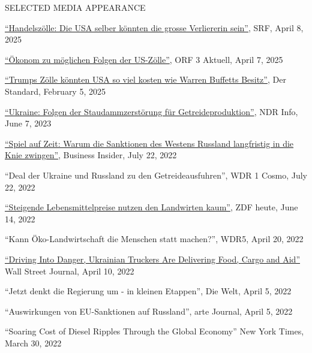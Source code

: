 \documentclass{article}
\begin{document}
\begin{minipage}[t]{0.12\textwidth}
    {\selectfont SELECTED MEDIA \mbox APPEARANCE} \\
\end{minipage}
\hspace{5mm}
\begin{minipage}[t]{0.8\textwidth}
  \href{https://www.srf.ch/audio/echo-der-zeit/handelszoelle-die-usa-selber-koennten-die-grosse-verliererin-sein?partId=77nj5adJX0fKQd92D0cUOK53Vmw}{``Handelszölle: Die USA selber könnten die grosse Verliererin sein''}, SRF, April 8, 2025 \par
  \href{https://on.orf.at/video/14270682/15857146/oekonom-zu-moeglichen-folgen-der-us-zoelle}{``Ökonom zu möglichen Folgen der US-Zölle''}, ORF 3 Aktuell, April 7, 2025 \par
    \href{https://www.derstandard.de/story/3000000256055/trumps-zoelle-koennten-usa-so-viel-kosten-wie-warren-buffett-besitzt}{``Trumps Zölle könnten USA so viel kosten wie Warren Buffetts Besitz''}, Der Standard, February 5, 2025 \par
    \href{https://www.ndr.de/nachrichten/info/Wirtschaft-Folgen-der-Staudammzerstoerung-fuer-Getreideproduktion,audio1398696.html}{``Ukraine: Folgen der Staudammzerstörung für Getreideproduktion''}, NDR Info, June 7, 2023 \par
    \href{https://www.businessinsider.de/politik/welt/spiel-auf-zeit-warum-die-bundesregierung-und-experten-glauben-dass-die-sanktionen-des-westens-russland-langfristig-in-die-knie-zwingen-werden/}{``Spiel auf Zeit: Warum die Sanktionen des Westens Russland langfristig in die Knie zwingen''}, Business Insider, July 22, 2022 \par
    ``Deal der Ukraine und Russland zu den Getreideausfuhren'', WDR 1 Cosmo, July 22, 2022 \par
    \href{https://www.zdf.de/nachrichten/heute-19-uhr/bauerntag-luebeck-oezdemir-video-100.html}{``Steigende Lebensmittelpreise nutzen den Landwirten kaum''}, ZDF heute, June 14, 2022 \par
    ``Kann Öko-Landwirtschaft die Menschen statt machen?'', WDR5, April 20, 2022 \par
    \href{https://www.wsj.com/articles/driving-into-danger-ukrainian-truckers-are-delivering-food-cargo-and-aid-11649595601}{``Driving Into Danger, Ukrainian Truckers Are Delivering Food, Cargo and Aid''} Wall Street Journal, April 10, 2022 \par
    ``Jetzt denkt die Regierung um - in kleinen Etappen'', Die Welt, April 5, 2022 \par
    ``Auswirkungen von EU-Sanktionen auf Russland'', arte Journal, April 5, 2022 \par
    ``Soaring Cost of Diesel Ripples Through the Global Economy'' New York Times, March 30, 2022 \par
\end{minipage}
\medskip
\end{document}
